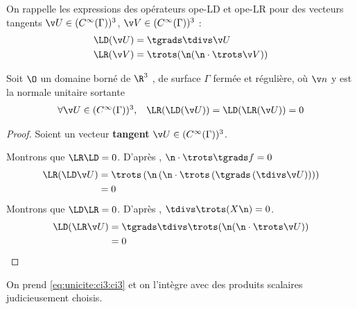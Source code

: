 On rappelle les expressions des opérateurs \gls{ope-LD} et \gls{ope-LR} pour des vecteurs tangents $\v U \in (C^\infty(\Gamma))^3$, $ \v V \in (C^\infty(\Gamma))^3$ :
\begin{align*}
\LD(\v U) &= \tgrads \tdivs \v U\\
\LR(\v V) &= \trots( \n ( \n \cdot \trots \v V))\\
\end{align*}
\begin{prop}
Soit $\O$ un domaine borné de $\R^3$ , de surface $\Gamma$ fermée et régulière, où $\v n$ y est la normale unitaire
sortante
\begin{equation}
\begin{matrix}
\forall \v U \in (C^\infty(\Gamma))^3 ,& \LR(\LD(\v U)) = \LD(\LR(\v U)) = 0
\end{matrix}
\end{equation}
\end{prop}
\begin{proof}
Soient un vecteur \textbf{tangent} $\v U \in (C^\infty(\Gamma))^3$.

Montrons que $\LR\LD = 0$. D’après \cite[p.~1029, A3.42]{bladel_electromagnetic_2007}, $\n \cdot \trots\tgrads f = 0$
\begin{align*}
\LR(\LD \v U)  &= \trots \left(\n \left(\n \cdot \trots \left( \tgrads \left(\tdivs \v U\right)\right)\right)\right) \\
&= 0
\end{align*}
Montrons que $\LD\LR = 0$. D’après \cite[p.~1029, A3.43]{bladel_electromagnetic_2007}, $\tdivs \trots (X\n) = 0$.
\begin{align*}
\LD(\LR \v U) &= \tgrads \tdivs \trots (\n (\n \cdot \trots \v U)) \\
&= 0
\end{align*}
\end{proof}


On prend \eqref{eq:unicite:ci3:ci3} et on l’intègre avec des produits scalaires judicieusement choisis.

